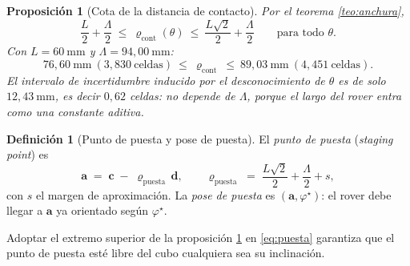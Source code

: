 \documentclass[11pt,a4paper]{article}
\newtheorem{proposicion}[teorema]{Proposición}
\theoremstyle{definition}
\newtheorem{definicion}[teorema]{Definición}
\newcommand{\dd}{\mathbf{d}}
\newcommand{\cc}{\mathbf{c}}
\newcommand{\aaa}{\mathbf{a}}
\begin{document}
\begin{proposicion}[Cota de la distancia de contacto]
\label{prop:rhocont}
Por el teorema \ref{teo:anchura},
\begin{equation}
  \frac{L}{2} + \frac{\Lambda}{2}
  \ \le\ \varrho_{\mathrm{cont}}(\theta)\ \le\
  \frac{L\sqrt2}{2} + \frac{\Lambda}{2}
  \qquad \text{para todo } \theta .
\end{equation}
Con $L = 60\ \mathrm{mm}$ y $\Lambda = 94{,}00\ \mathrm{mm}$:
\[
  76{,}60\ \mathrm{mm}\ (3{,}830\ \text{celdas})
  \ \le\ \varrho_{\mathrm{cont}}\ \le\
  89{,}03\ \mathrm{mm}\ (4{,}451\ \text{celdas}).
\]
El intervalo de incertidumbre inducido por el desconocimiento de $\theta$ es de solo
$12{,}43\ \mathrm{mm}$, es decir $0{,}62$ celdas: no depende de $\Lambda$, porque el
largo del rover entra como una constante aditiva.
\end{proposicion}

\begin{definicion}[Punto de puesta y pose de puesta]
El \emph{punto de puesta} (\textit{staging point}) es
\begin{equation}
  \aaa \;=\; \cc \;-\; \varrho_{\mathrm{puesta}}\,\dd,
  \qquad
  \varrho_{\mathrm{puesta}} \;=\; \frac{L\sqrt2}{2} + \frac{\Lambda}{2} + s ,
  \label{eq:puesta}
\end{equation}
con $s$ el margen de aproximación. La \emph{pose de puesta} es $(\aaa, \varphi^\star)$:
el rover debe llegar a $\aaa$ ya orientado según $\varphi^\star$.
\end{definicion}

Adoptar el extremo superior de la proposición \ref{prop:rhocont} en \eqref{eq:puesta}
garantiza que el punto de puesta esté libre del cubo cualquiera sea su inclinación.
\end{document}
